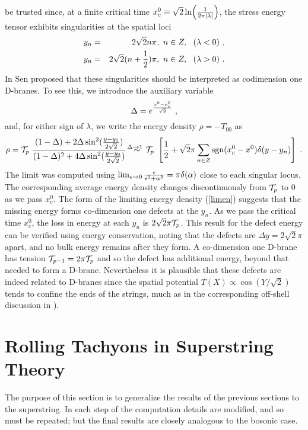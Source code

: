 \documentclass[a4paper,12pt]{article}
\begin{document}
be trusted since, at  a finite critical time 
$x^0_c\equiv \sqrt{2}\ln \Bigl({1 \over{2 \pi |\lambda|}}\Bigr) $, 
the stress energy tensor exhibits singularities at the spatial loci
\begin{eqnarray}
y_n& = & 2\sqrt{2} n \pi, ~n \in Z, ~~ (\lambda < 0)~, \\
y_n&=&2 \sqrt{2} (n+{1 \over 2}) \pi  , ~n \in Z, ~~(\lambda > 0)~. 
\end{eqnarray}
In \cite{senspac} Sen proposed that these singularities should be interpreted 
as codimension one D-branes. To see this, we introduce the auxiliary variable
\begin{equation}
\Delta=e^{x^0 -x_c^0 \over \sqrt{2}}~,
\end{equation}
and, for either sign of $\lambda$, we write the energy density $\rho=-T_{00}$ as 
\begin{equation}
\rho={\cal T}_p~
{(1-\Delta) + 2\Delta \sin^2({y-y_0\over 2\sqrt{2}})
 \over (1-\Delta)^2 + 4\Delta \sin^2 ({y-y_0\over 2\sqrt{2}})}
~~\sim \vspace{0.8cm} \hspace{-0.65cm}{}^{\Delta \rightarrow 1}  ~{\cal T}_p ~
\left[ {1\over 2}+  \sqrt{2}\pi\sum_{n\in Z} {\rm sgn}(x^0_c-x^0)\delta(y-y_n)\right] ~.
\label{limen}
\end{equation}
The limit was computed using $\lim_{\epsilon\to 0} {\epsilon\over \epsilon^2+\alpha^2}=\pi\delta({\alpha})$ close to each singular locus.
The corresponding average energy density changes discontinuously from ${\cal T}_p$ to $0$ 
as we pass $x^0_c$. The form of the limiting energy density (\ref{limen}) suggests that the
missing energy forms co-dimension one defects at the $y_n$. As we pass the 
critical time $x^0_c$, the loss in energy at each $y_n$ is $2\sqrt{2}\pi{\cal T}_p$. 
This result for the defect energy can be verified using energy conservation, noting that
the defects are $\Delta y=2\sqrt{2}\pi$ apart, and no bulk energy remains after they form.
A co-dimension one D-brane has tension ${\cal T}_{p-1}=2\pi{\cal T}_p$ and so 
the defect has additional energy, beyond that needed to form a D-brane.
Nevertheless it is plausible that these defects are indeed related to D-branes
since  the spatial potential $T(X)\propto\cos(Y/\sqrt{2})$ tends to 
confine the ends of the strings, much as in the corresponding off-shell discussion 
in \cite{Harvey:2000na}).




\section{Rolling Tachyons in Superstring Theory}
The purpose of this section is to generalize the results of the previous sections to the
superstring. In each step of the computation details are modified, 
and so must be repeated;  but the 
final results are closely analogous to the bosonic case. 
\end{document}
